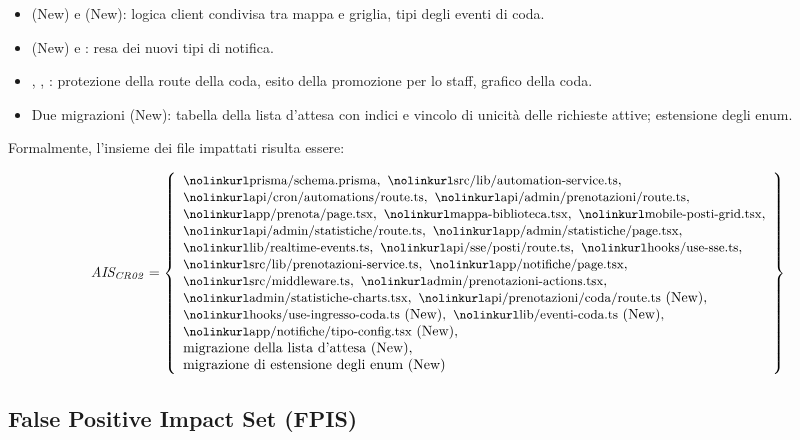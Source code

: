 \documentclass[11pt,a4paper,oneside,openany]{book}
\newcommand{\insieme}[2]{%
  \[ \mathit{#1} = \left\{ \begin{array}{l} #2 \end{array} \right\} \]}
\newcommand{\elem}[1]{\text{\file{#1}}}
\begin{document}
\begin{itemize}
\begin{itemize}
    \item {} (New) e
           (New): logica client condivisa tra mappa e
          griglia, tipi degli eventi di coda.
    \item {} (New) e
          : resa dei nuovi tipi di notifica.
    \item {}, ,
          : protezione della route della
          coda, esito della promozione per lo staff, grafico della coda.
    \item Due migrazioni (New): tabella della lista d'attesa con indici e
          vincolo di unicità delle richieste attive; estensione degli enum.
  \end{itemize}
\end{itemize}

Formalmente, l'insieme dei file impattati risulta essere:

\insieme{AIS_{CR02}}{
  \elem{prisma/schema.prisma},\ \elem{src/lib/automation-service.ts},\\
  \elem{api/cron/automations/route.ts},\ \elem{api/admin/prenotazioni/route.ts},\\
  \elem{app/prenota/page.tsx},\ \elem{mappa-biblioteca.tsx},\ \elem{mobile-posti-grid.tsx},\\
  \elem{api/admin/statistiche/route.ts},\ \elem{app/admin/statistiche/page.tsx},\\
  \elem{lib/realtime-events.ts},\ \elem{api/sse/posti/route.ts},\ \elem{hooks/use-sse.ts},\\
  \elem{src/lib/prenotazioni-service.ts},\ \elem{app/notifiche/page.tsx},\\
  \elem{src/middleware.ts},\ \elem{admin/prenotazioni-actions.tsx},\\
  \elem{admin/statistiche-charts.tsx},\ \elem{api/prenotazioni/coda/route.ts}\ \text{(New)},\\
  \elem{hooks/use-ingresso-coda.ts}\ \text{(New)},\ \elem{lib/eventi-coda.ts}\ \text{(New)},\\
  \elem{app/notifiche/tipo-config.tsx}\ \text{(New)},\\
  \text{migrazione della lista d'attesa (New)},\\
  \text{migrazione di estensione degli enum (New)}}

\subsection{False Positive Impact Set (FPIS)}
\end{document}
